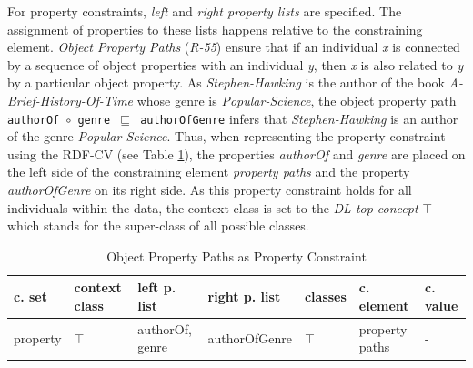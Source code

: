 \documentclass[a4paper,fontsize=11pt]{scrartcl}
\newcommand{\ms}[1]{\texttt{#1}}
\begin{document}
For property constraints, \emph{left} and \emph{right property lists} are specified.
The assignment of properties to these lists happens relative to the constraining element.
\emph{Object Property Paths} (\emph{R-55})
ensure that if an individual \emph{x} is connected by a sequence of object properties with an individual \emph{y}, 
then \emph{x} is also related to \emph{y} by a particular object property. 
As \emph{Stephen-Hawking} is the author of the book \emph{A-Brief-History-Of-Time} 
whose genre is \emph{Popular-Science}, 
the object property path {\small\ms{authorOf $\circ$ genre $\sqsubseteq$ authorOfGenre}} infers that \emph{Stephen-Hawking} is an author of the genre \emph{Popular-Science}. 
Thus, when representing the property constraint using the RDF-CV (see Table \ref{tab:property-constraint-object-property-paths}), the properties \emph{authorOf} and \emph{genre} are placed on the left side of the constraining element \emph{property paths}
and the property \emph{authorOfGenre} on its right side. As this property constraint holds for all individuals within the data, the context class is set to the \emph{DL top concept} $\top$ which stands for the super-class of all possible classes.
\begin{table}[H]
  \scriptsize
  \sffamily
  \vspace{0cm}
	\caption{Object Property Paths as Property Constraint}
	\label{tab:property-constraint-object-property-paths}
	\centering
		\begin{tabular}{l|l|l|l|l|l|l}
      \textbf{c. set} & \textbf{context class} & \textbf{left p. list} & \textbf{right p. list} & \textbf{classes} & \textbf{c. element} & \textbf{c. value} \\
      \hline
      property & $\top$ & authorOf, genre & authorOfGenre & $\top$ & property paths & - \\
		\end{tabular}
\end{table}
\end{document}
